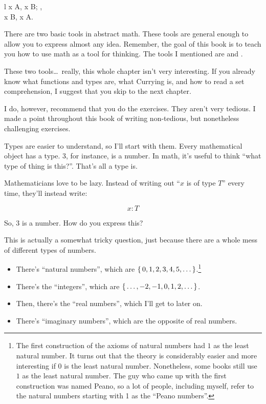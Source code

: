 \begin{alignmath}{l}
  \fall x \in A, x \in B; ,\\
  \fall x \in B, x \in A.
\end{alignmath}

There are two basic tools in abstract math. These tools are general enough to
allow you to express almost any idea. Remember, the goal of this book is to
teach you how to use math as a tool for thinking. The tools I mentioned are
 and .

These two tools\dots\ really, this whole chapter isn't very interesting. If you
already know what functions and types are, what Currying is, and how to read a
set comprehension, I suggest that you skip to the next chapter.

I do, however, recommend that you do the exercises. They aren't very tedious. I
made a point throughout this book of writing non-tedious, but nonetheless
challenging exercises.


Types are easier to understand, so I'll start with them. Every mathematical
object has a type. $3$, for instance, is a number. In math, it's useful to think
``what type of thing is this?''. That's all a type is.

Mathematicians love to be lazy. Instead of writing out ``$x$ is of type $T$''
every time, they'll instead write:

\begin{equation}
    x : T
\end{equation}

So, $3$ is a number. How do you express this?

This is actually a somewhat tricky question, just because there are a whole mess
of different types of numbers.

\begin{itemize}
  \item There's ``natural numbers'', which are
    $\left\{\, 0, 1, 2, 3, 4, 5, \dots \,\right\}$.\footnote{The first construction of the
      axioms of natural numbers had $1$ as the least natural number. It turns
      out that the theory is considerably easier and more interesting if $0$ is
      the least natural number. Nonetheless, some books still use $1$ as the
      least natural number. The guy who came up with the first construction was
      named Peano, so a lot of people, including myself, refer to the natural
      numbers starting with 1 as the ``Peano numbers''.}
  \item There's the ``integers'', which are
    \(\left\{\, \dots, -2, -1, 0, 1, 2, \dots \,\right\}\).
  \item Then, there's the ``real numbers'', which I'll get to later on.
  \item There's ``imaginary numbers'', which are the opposite of real
    numbers.
\end{itemize}

